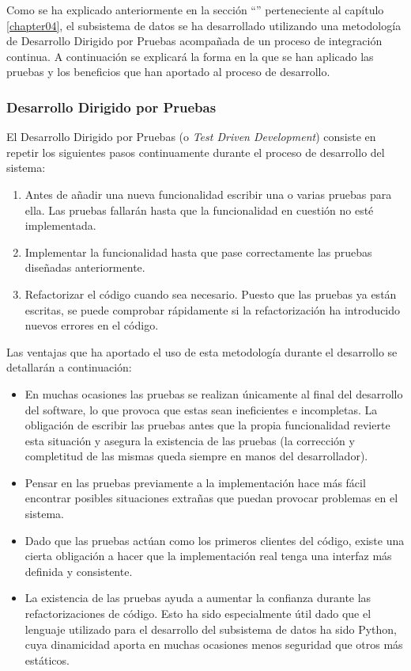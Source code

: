 Como se ha explicado anteriormente en la sección ``'' perteneciente al capítulo \ref{chapter04}, el subsistema de datos se ha desarrollado utilizando una metodología de Desarrollo Dirigido por Pruebas acompañada de un proceso de integración continua.  A continuación se explicará la forma en la que se han aplicado las pruebas y los beneficios que han aportado al proceso de desarrollo.

\subsubsection{Desarrollo Dirigido por Pruebas}
	El Desarrollo Dirigido por Pruebas (o \textit{Test Driven Development}) consiste en repetir los siguientes pasos continuamente durante el proceso de desarrollo del sistema:
	\begin{enumerate}
		\item
			Antes de añadir una nueva funcionalidad escribir una o varias pruebas para ella.  Las pruebas fallarán hasta que la funcionalidad en cuestión no esté implementada.
		\item
			Implementar la funcionalidad hasta que pase correctamente las pruebas diseñadas anteriormente.
		\item
			Refactorizar el código cuando sea necesario.  Puesto que las pruebas ya están escritas, se puede comprobar rápidamente si la refactorización ha introducido nuevos errores en el código.
	\end{enumerate}
	
	Las ventajas que ha aportado el uso de esta metodología durante el desarrollo se detallarán a continuación:
	\begin{itemize}
		\item
			En muchas ocasiones las pruebas se realizan únicamente al final del desarrollo del software, lo que provoca que estas sean ineficientes e incompletas.  La obligación de escribir las pruebas antes que la propia funcionalidad revierte esta situación y asegura la existencia de las pruebas (la corrección y completitud de las mismas queda siempre en manos del desarrollador).
		\item
			Pensar en las pruebas previamente a la implementación hace más fácil encontrar posibles situaciones extrañas que puedan provocar problemas en el sistema.
		\item
			Dado que las pruebas actúan como los primeros clientes del código, existe una cierta obligación a hacer que la implementación real tenga una interfaz más definida y consistente.
		\item
			La existencia de las pruebas ayuda a aumentar la confianza durante las refactorizaciones de código.  Esto ha sido especialmente útil dado que el lenguaje utilizado para el desarrollo del subsistema de datos ha sido Python, cuya dinamicidad aporta en muchas ocasiones menos seguridad que otros más estáticos.
	\end{itemize}
	
